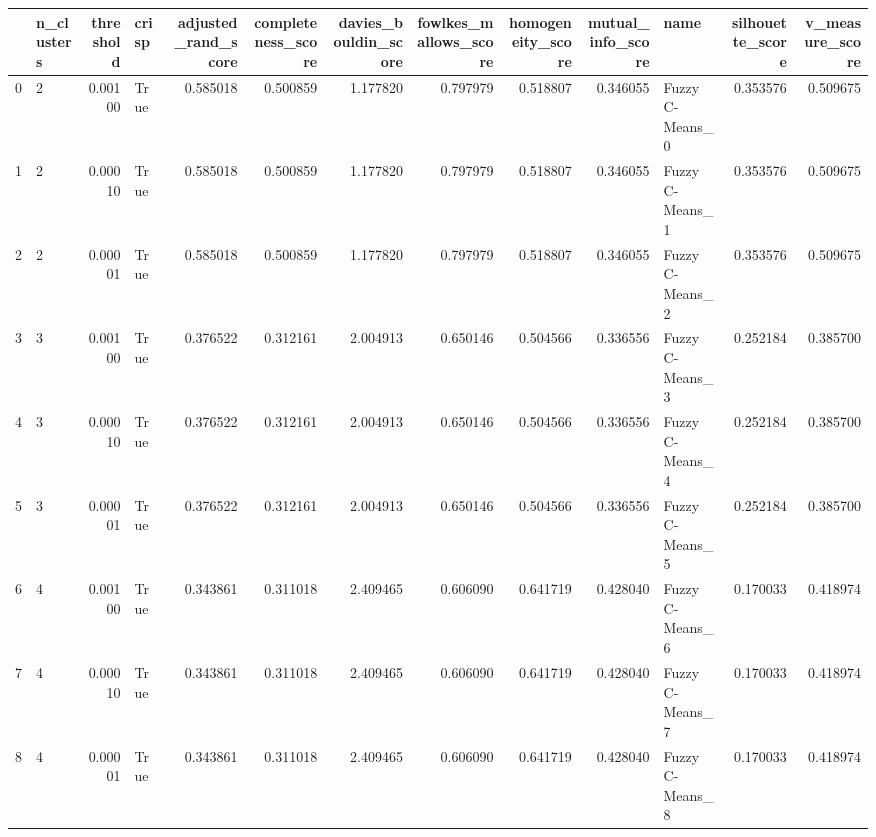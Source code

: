 \begin{tabular}{llrlrrrrrrlrr}
\toprule
{} & n\_clusters &  threshold & crisp &  adjusted\_rand\_score &  completeness\_score &  davies\_bouldin\_score &  fowlkes\_mallows\_score &  homogeneity\_score &  mutual\_info\_score &              name &  silhouette\_score &  v\_measure\_score \\
\midrule
0  &          2 &    0.00100 &  True &             0.585018 &            0.500859 &              1.177820 &               0.797979 &           0.518807 &           0.346055 &   Fuzzy C-Means\_0 &          0.353576 &         0.509675 \\
1  &          2 &    0.00010 &  True &             0.585018 &            0.500859 &              1.177820 &               0.797979 &           0.518807 &           0.346055 &   Fuzzy C-Means\_1 &          0.353576 &         0.509675 \\
2  &          2 &    0.00001 &  True &             0.585018 &            0.500859 &              1.177820 &               0.797979 &           0.518807 &           0.346055 &   Fuzzy C-Means\_2 &          0.353576 &         0.509675 \\
3  &          3 &    0.00100 &  True &             0.376522 &            0.312161 &              2.004913 &               0.650146 &           0.504566 &           0.336556 &   Fuzzy C-Means\_3 &          0.252184 &         0.385700 \\
4  &          3 &    0.00010 &  True &             0.376522 &            0.312161 &              2.004913 &               0.650146 &           0.504566 &           0.336556 &   Fuzzy C-Means\_4 &          0.252184 &         0.385700 \\
5  &          3 &    0.00001 &  True &             0.376522 &            0.312161 &              2.004913 &               0.650146 &           0.504566 &           0.336556 &   Fuzzy C-Means\_5 &          0.252184 &         0.385700 \\
6  &          4 &    0.00100 &  True &             0.343861 &            0.311018 &              2.409465 &               0.606090 &           0.641719 &           0.428040 &   Fuzzy C-Means\_6 &          0.170033 &         0.418974 \\
7  &          4 &    0.00010 &  True &             0.343861 &            0.311018 &              2.409465 &               0.606090 &           0.641719 &           0.428040 &   Fuzzy C-Means\_7 &          0.170033 &         0.418974 \\
8  &          4 &    0.00001 &  True &             0.343861 &            0.311018 &              2.409465 &               0.606090 &           0.641719 &           0.428040 &   Fuzzy C-Means\_8 &          0.170033 &         0.418974 \\

\end{tabular}
